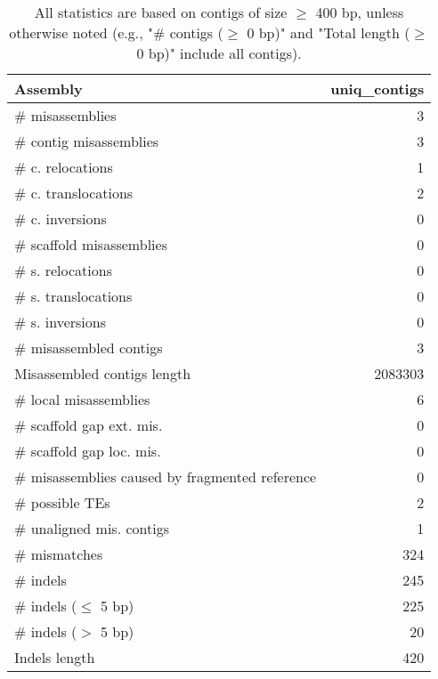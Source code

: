 \documentclass[12pt,a4paper]{article}
\begin{document}
\begin{table}[ht]
\begin{center}
\caption{All statistics are based on contigs of size $\geq$ 400 bp, unless otherwise noted (e.g., "\# contigs ($\geq$ 0 bp)" and "Total length ($\geq$ 0 bp)" include all contigs).}
\begin{tabular}{|l*{1}{|r}|}
\hline
Assembly & uniq\_contigs \\ \hline
\# misassemblies & 3 \\ \hline
\hspace{2mm}\# contig misassemblies & 3 \\ \hline
\hspace{5mm}\# c. relocations & 1 \\ \hline
\hspace{5mm}\# c. translocations & 2 \\ \hline
\hspace{5mm}\# c. inversions & 0 \\ \hline
\hspace{2mm}\# scaffold misassemblies & 0 \\ \hline
\hspace{5mm}\# s. relocations & 0 \\ \hline
\hspace{5mm}\# s. translocations & 0 \\ \hline
\hspace{5mm}\# s. inversions & 0 \\ \hline
\# misassembled contigs & 3 \\ \hline
Misassembled contigs length & 2083303 \\ \hline
\# local misassemblies & 6 \\ \hline
\# scaffold gap ext. mis. & 0 \\ \hline
\# scaffold gap loc. mis. & 0 \\ \hline
\# misassemblies caused by fragmented reference & 0 \\ \hline
\# possible TEs & 2 \\ \hline
\# unaligned mis. contigs & 1 \\ \hline
\# mismatches & 324 \\ \hline
\# indels & 245 \\ \hline
\hspace{5mm}\# indels ($\leq$ 5 bp) & 225 \\ \hline
\hspace{5mm}\# indels ($>$ 5 bp) & 20 \\ \hline
Indels length & 420 \\ \hline
\end{tabular}
\end{center}
\end{table}
\end{document}

